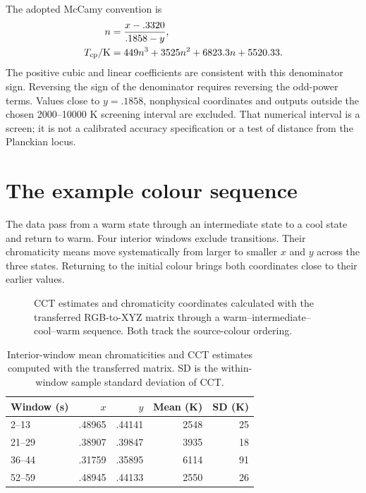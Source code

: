 The adopted McCamy convention is
\begin{align}
 n&=\frac{x-.3320}{.1858-y},\\
 T_{\rm cp}/\mathrm{K}&=449n^3+3525n^2+6823.3n+5520.33.
 \label{eq:colour-temperature-cubic}
\end{align}
The positive cubic and linear coefficients are consistent with this denominator sign. Reversing the sign of the denominator requires reversing the odd-power terms. Values close to $y=.1858$, nonphysical coordinates and outputs outside the chosen 2000--10000 K screening interval are excluded. That numerical interval is a screen; it is not a calibrated accuracy specification or a test of distance from the Planckian locus.

\section{The example colour sequence}
The data pass from a warm state through an intermediate state to a cool state and return to warm. Four interior windows exclude transitions. Their chromaticity means move systematically from larger to smaller $x$ and $y$ across the three states. Returning to the initial colour brings both coordinates close to their earlier values.

\begin{figure}[!htbp]
\centering
\caption{CCT estimates and chromaticity coordinates calculated with the transferred RGB-to-XYZ matrix through a warm--intermediate--cool--warm sequence. Both track the source-colour ordering.}
\label{fig:colour-temperature-example}
\end{figure}

\begin{table}[!htbp]
\caption{Interior-window mean chromaticities and CCT estimates computed with the transferred matrix. SD is the within-window sample standard deviation of CCT.}
\label{tab:colour-temperature-values}
\centering\footnotesize
\begin{tabular}{@{}lrrrr@{}}\toprule
Window (s) & $x$ & $y$ & Mean (K) & SD (K)\\\midrule
2--13 & .48965 & .44141 & 2548 & 25\\
21--29 & .38907 & .39847 & 3935 & 18\\
36--44 & .31759 & .35895 & 6114 & 91\\
52--59 & .48945 & .44133 & 2550 & 26\\\bottomrule
\end{tabular}
\end{table}

